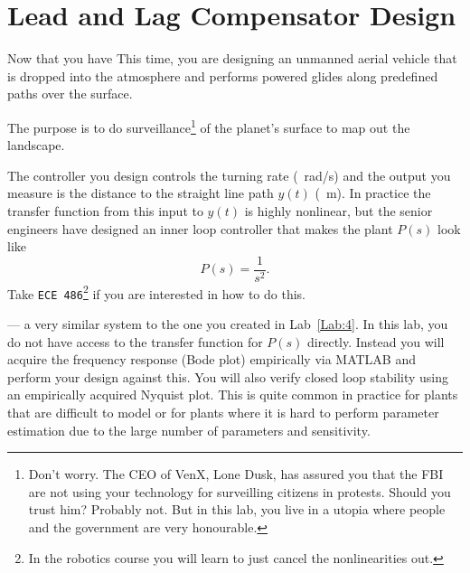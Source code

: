\chapter{Lead and Lag Compensator Design}\label{Lab:5}
Now that you have 
This time, you are designing an unmanned aerial vehicle that is dropped into the atmosphere and performs powered glides along predefined paths over the surface.
%
\begin{center}
\end{center}
%
The purpose is to do surveillance\footnote{Don't worry. The CEO of VenX, Lone Dusk, has assured you that the FBI are not using your technology for surveilling citizens in protests. Should you trust him? Probably not. But in this lab, you live in a utopia where people and the government are very honourable.} of the planet's surface to map out the landscape.

The controller you design controls the turning rate (\SI{}{rad/s}) and the output you measure is the distance to the straight line path \(y(t)\) (\SI{}{m}).
In practice the transfer function from this input to \(y(t)\) is highly nonlinear, but the senior engineers have designed an inner loop controller that makes the plant \(P(s)\) look like
\[
  P(s) = \frac{1}{s^2}.
\]
Take \texttt{ECE 486}\footnote{In the robotics course you will learn to just cancel the nonlinearities out.} if you are interested in how to do this.

 --- a very similar system to the one you created in Lab~\ref{Lab:4}.
In this lab, you do not have access to the transfer function for \(P(s)\) directly.
Instead you will acquire the frequency response (Bode plot) empirically via MATLAB and perform your design against this.
You will also verify closed loop stability using an empirically acquired Nyquist plot.
This is quite common in practice for plants that are difficult to model or for plants where it is hard to perform parameter estimation due to the large number of parameters and sensitivity.

